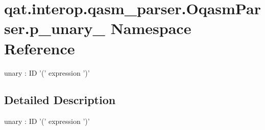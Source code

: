 \hypertarget{namespaceqat_1_1interop_1_1qasm__parser_1_1OqasmParser_1_1p__unary__6}{\section{qat.\-interop.\-qasm\-\_\-parser.\-Oqasm\-Parser.\-p\-\_\-unary\-\_ Namespace Reference}
\label{namespaceqat_1_1interop_1_1qasm__parser_1_1OqasmParser_1_1p__unary__6}
}


unary \-: I\-D '(' expression ')'  




\subsection{Detailed Description}
unary \-: I\-D '(' expression ')' 